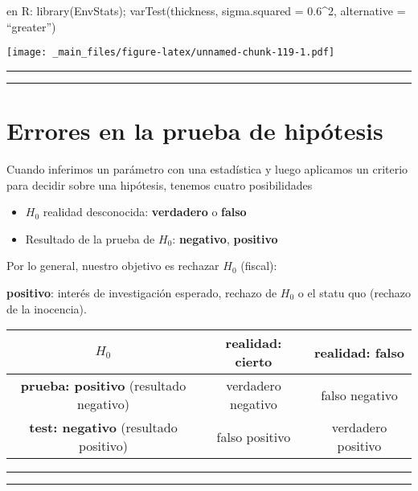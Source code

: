 \documentclass[
]{book}
\providecommand{\tightlist}{%
  \setlength{\itemsep}{0pt}\setlength{\parskip}{0pt}}
\begin{document}
en R: library(EnvStats);
varTest(thickness, sigma.squared = 0.6\^{}2, alternative = ``greater'')

\texttt{[image: \_main\_files/figure-latex/unnamed-chunk-119-1.pdf]}

\begin{center}\rule{0.5\linewidth}{0.5pt}\end{center}

\begin{center}\rule{0.5\linewidth}{0.5pt}\end{center}

\hypertarget{errores-en-la-prueba-de-hipuxf3tesis}{%
\section{Errores en la prueba de hipótesis}\label{errores-en-la-prueba-de-hipuxf3tesis}}

Cuando inferimos un parámetro con una estadística y luego aplicamos un criterio para decidir sobre una hipótesis, tenemos cuatro posibilidades

\begin{itemize}
\tightlist
\item
  \(H_0\) realidad desconocida: \textbf{verdadero} o \textbf{falso}
\item
  Resultado de la prueba de \(H_0\): \textbf{negativo}, \textbf{positivo}
\end{itemize}

Por lo general, nuestro objetivo es rechazar \(H_0\) (fiscal):

\textbf{positivo}: interés de investigación esperado, rechazo de \(H_0\) o el statu quo (rechazo de la inocencia).

\begin{longtable}[]{@{}ccc@{}}
\toprule
\(H_0\) & realidad: cierto & realidad: falso \\
\midrule
\endhead
\textbf{prueba: positivo} (resultado negativo) & verdadero negativo & falso negativo \\
\textbf{test: negativo} (resultado positivo) & falso positivo & verdadero positivo \\
\bottomrule
\end{longtable}

\begin{center}\rule{0.5\linewidth}{0.5pt}\end{center}

\begin{center}\rule{0.5\linewidth}{0.5pt}\end{center}
\end{document}
